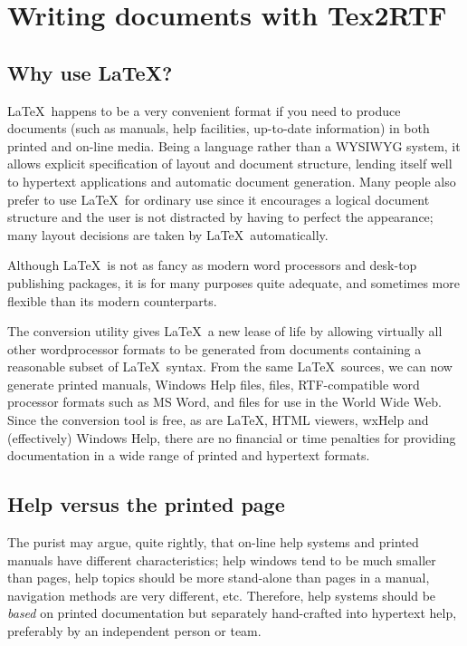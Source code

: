 \chapter{Writing documents with Tex2RTF}%
%
\setfooter{\thepage}{}{}{}{}{\thepage}%

\section{Why use \LaTeX?}

\LaTeX\ happens to be a very convenient format if you need to produce
documents (such as manuals, help facilities, up-to-date information) in
both printed and on-line media. Being a language rather than a WYSIWYG system,
it allows explicit specification of layout and document structure, lending
itself well to hypertext applications and automatic document generation.
Many people also prefer to use \LaTeX\ for ordinary use since it encourages
a logical document structure and the user is not distracted by having to perfect
the appearance; many layout decisions are taken by \LaTeX\ automatically.

Although \LaTeX\ is not as fancy as modern word processors and desk-top
publishing packages, it is for many purposes quite adequate, and sometimes
more flexible than its modern counterparts.

The conversion utility gives \LaTeX\ a new lease of life by allowing
virtually all other wordprocessor formats to be generated from documents
containing a reasonable subset of \LaTeX\ syntax. From the same \LaTeX\ 
sources, we can now generate printed manuals, Windows Help files, \rtfsp
files, RTF-compatible word processor formats such as MS Word, and \popref{HTML}{html}\rtfsp
files for use in the World Wide Web. Since the conversion tool is
free, as are \LaTeX, HTML viewers, wxHelp and (effectively) Windows
Help, there are no financial or time penalties for providing
documentation in a wide range of printed and hypertext formats.

\section{Help versus the printed page}%

The purist may argue, quite rightly, that on-line help systems and
printed manuals have different characteristics; help windows tend to be
much smaller than pages, help topics should be more stand-alone than
pages in a manual, navigation methods are very different, etc. Therefore,
help systems should be {\it based} on printed documentation but
separately hand-crafted into hypertext help, preferably by an
independent person or team.

